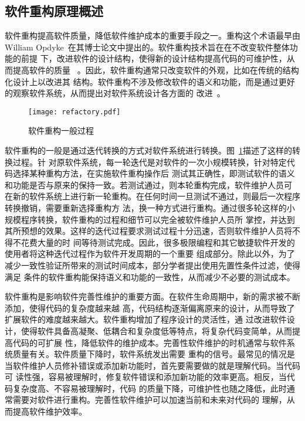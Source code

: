 \subsection{软件重构原理概述}

软件重构提高软件质量，降低软件维护成本的重要手段之一。重构这个术语最早由William
Opdyke~\cite{opdyke1992refactoring}在其博士论文中提出的。软件重构技术旨在在不改变软件整体功能的前提
下，改进软件的设计结构，使得新的设计结构提高代码的可维护性，从而提高软件的质量
~\cite{fowler1999refactoring}。因此，软件重构通常只改变软件的外观，比如在传统的结构化设计上以改进其
结构。软件重构不涉及修改软件的语义和功能，而是通过更好的观察软件系统，从而提出对软件系统设计各方面的
改进~\cite{chikofsky1990reverse}。

\begin{figure}
  \centering
  \texttt{[image: refactory.pdf]}  
  \caption{\label{fig:refactory}软件重构一般过程}
\end{figure}

软件重构的一般是通过迭代转换的方式对软件系统进行转换。图~\ref{fig:refactory}描述了这样的转换过程。针
对原软件系统，每一轮迭代是对软件的一次小规模转换，针对特定代码选择某种重构方法，在实施软件重构操作后
测试其正确性，即测试软件的语义和功能是否与原来的保持一致。若测试通过，则本轮重构完成，软件维护人员可
在新的软件系统上进行新一轮重构。在任何时间一旦测试不通过，则最后一次程序转换撤销，需要重新选择重构方
法，换一种方式进行重构。通过很多轮这样的小规模程序转换，软件重构的过程和细节可以完全被软件维护人员所
掌控，并达到其所预想的效果。这样的迭代过程要求测试过程十分迅速，否则软件维护人员将不得不花费大量的时
间等待测试完成。因此，很多极限编程和其它敏捷软件开发的使用者将这种迭代过程作为软件开发周期的一个重要
组成部分。除此以外，为了减少一致性验证所带来的测试时间成本，部分学者提出使用先置性条件过滤，使得满足
条件的软件重构能保持语义和功能的一致性，从而减少不必要的测试成本。

软件重构是影响软件完善性维护的重要方面。在软件生命周期中，新的需求被不断添加，使得代码的复杂度越来越
高，代码结构逐渐偏离原来的设计，从而导致了扩展软件的难度越来越大。软件重构增加了程序设计的灵活性，通
过改进软件设计，使得软件具备高凝聚、低耦合和复杂度低等特点，将复杂代码变简单，从而提高代码的可扩展
性，降低软件的维护成本。完善性软件维护的时机通常与软件系统质量有关。软件质量下降时，软件系统发出需要
重构的信号。最常见的情况是当软件维护人员修补错误或添加新功能时，首先要需要做的就是理解代码。当代码可
读性强，容易被理解时，修复软件错误和添加新功能的效率更高。相反，当代码复杂度高、不容易被理解时，代码
的质量下降，可维护性也随之降低，此时通常需要对软件进行重构。完善性软件维护可以加速当前和未来对代码的
理解，从而提高软件维护效率。

